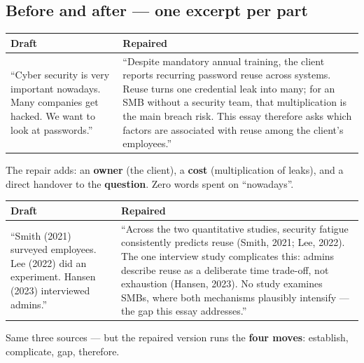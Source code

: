 \documentclass[11pt,a4paper,british,twoside=false,headings=small,chapterprefix=false,numbers=noenddot]{scrbook}
\begin{document}
\subsection{Before and after --- one excerpt per part}
\begin{center}\small
\small
  \renewcommand{\arraystretch}{1.4}
  \begin{tabular}{@{}p{6.3cm}p{6.5cm}@{}}
    \toprule
    \textbf{Draft} & \textbf{Repaired}\\
    \midrule
    ``Cyber security is very important nowadays. Many companies get hacked. We want to look at passwords.'' & ``Despite mandatory annual training, the client reports recurring password reuse across systems. Reuse turns one credential leak into many; for an SMB without a security team, that multiplication is the main breach risk. This essay therefore asks which factors are associated with reuse among the client's employees.''\\
    \bottomrule
  \end{tabular}
  

  The repair adds: an \textbf{owner} (the client), a \textbf{cost}
  (multiplication of leaks), and a direct handover to the \textbf{question}.
  Zero words spent on ``nowadays''.
\end{center}

\begin{center}\small
\small
  \renewcommand{\arraystretch}{1.4}
  \begin{tabular}{@{}p{6.3cm}p{6.5cm}@{}}
    \toprule
    \textbf{Draft} & \textbf{Repaired}\\
    \midrule
    ``Smith (2021) surveyed employees. Lee (2022) did an experiment. Hansen (2023) interviewed admins.'' & ``Across the two quantitative studies, security fatigue consistently predicts reuse (Smith, 2021; Lee, 2022). The one interview study complicates this: admins describe reuse as a deliberate time trade-off, not exhaustion (Hansen, 2023). No study examines SMBs, where both mechanisms plausibly intensify --- the gap this essay addresses.''\\
    \bottomrule
  \end{tabular}
  

  Same three sources --- but the repaired version runs the \textbf{four
  moves}: establish, complicate, gap, therefore.
\end{center}
\end{document}
